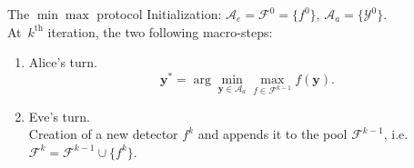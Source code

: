 \documentclass[10pt,aspectratio=169]{beamer}
\newcommand{\fset}{\mathcal{F}}
\begin{document}

\begin{frame}{The $\min\max$ protocol}
    \alert{Initialization}: $\mathcal{A}_e = \fset^{0} = \{f^0\}$,  $\mathcal{A}_a = \{\mathcal{Y}^0\}$. \\
    \pause
    \alert{At~$k^{\mathrm{th}}$ iteration}, the two following macro-steps: 
    \begin{enumerate}
        \item \alert<2>{Alice's turn.} 
            \begin{equation}
                \mathbf{y}^\ast = \arg \min_{\mathbf{y} \in \mathcal{A}_a} \max_{f \in \fset^{k-1}} f(\mathbf{y}).
                \label{eq:stepone}	
            \end{equation}
            \pause
        \item Eve's turn. \\ Creation of a new detector $f^k$ and appends it to the pool $\fset^{k-1}$, i.e. $\fset^k = \fset^{k-1} \cup \{f^k\}.$
    \end{enumerate}
\end{frame}

\end{document}
